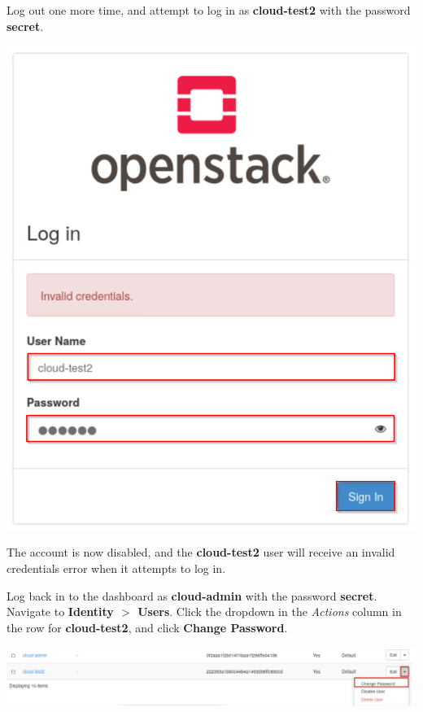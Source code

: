 \documentclass[letterpaper, 12pt]{article}
\begin{document}
\begin{enumerate}
    \begin{labstep}
        Log out one more time, and attempt to log in as \textbf{cloud-test2} with the password \textbf{secret}.

        \begin{center}
            \includegraphics[scale=0.5]{images/part3/step14.png}
        \end{center}
    \end{labstep}

    \begin{notebox}
        The account is now disabled, and the \textbf{cloud-test2} user will receive an invalid credentials error when it attempts to log in.
    \end{notebox}

    \begin{labstep}
        Log back in to the dashboard as \textbf{cloud-admin} with the password \textbf{secret}.
        Navigate to \textbf{Identity $>$ Users}.
        Click the dropdown in the \textit{Actions} column in the row for \textbf{cloud-test2}, and click \textbf{Change Password}.

        \begin{center}
            \includegraphics[width=\linewidth]{images/part3/step15.png}
        \end{center}
    \end{labstep}


\end{enumerate}
\end{document}
